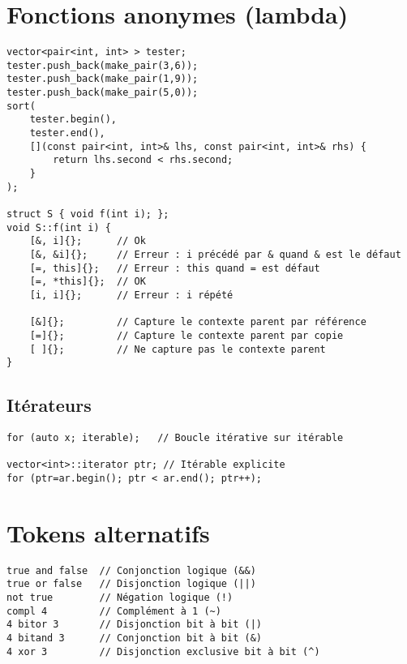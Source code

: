 \documentclass{article}
\begin{document}
\begin{multicols*}{3}
\begin{lstlisting}
\end{lstlisting}

\section*{Fonctions anonymes (lambda)}

\begin{lstlisting}
vector<pair<int, int> > tester;
tester.push_back(make_pair(3,6));
tester.push_back(make_pair(1,9));
tester.push_back(make_pair(5,0));
sort(
    tester.begin(),
    tester.end(),
    [](const pair<int, int>& lhs, const pair<int, int>& rhs) {
        return lhs.second < rhs.second;
    }
);

struct S { void f(int i); };
void S::f(int i) {
    [&, i]{};      // Ok
    [&, &i]{};     // Erreur : i précédé par & quand & est le défaut
    [=, this]{};   // Erreur : this quand = est défaut
    [=, *this]{};  // OK
    [i, i]{};      // Erreur : i répété

    [&]{};         // Capture le contexte parent par référence
    [=]{};         // Capture le contexte parent par copie
    [ ]{};         // Ne capture pas le contexte parent
}

\end{lstlisting}

\subsection*{Itérateurs}

\begin{lstlisting}
for (auto x; iterable);   // Boucle itérative sur itérable

vector<int>::iterator ptr; // Itérable explicite
for (ptr=ar.begin(); ptr < ar.end(); ptr++);

\end{lstlisting}


\section*{Tokens alternatifs}

\begin{lstlisting}
true and false  // Conjonction logique (&&)
true or false   // Disjonction logique (||)
not true        // Négation logique (!)
compl 4         // Complément à 1 (~)
4 bitor 3       // Disjonction bit à bit (|)
4 bitand 3      // Conjonction bit à bit (&)
4 xor 3         // Disjonction exclusive bit à bit (^)
\end{lstlisting}


\end{multicols*}
\end{document}
